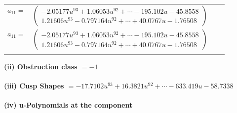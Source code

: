 \documentclass[1p]{elsarticle_modified}
\theoremstyle{definition}
\begin{document}
\begin{tabular}{m{7pt} m{180pt} m{7pt} m{180pt} }
\flushright $a_{11}=$&$\begin{pmatrix}-2.05177 u^{93}+1.06053 u^{92}+\cdots-195.102 u-45.8558\\1.21606 u^{93}-0.797164 u^{92}+\cdots+40.0767 u-1.76508\end{pmatrix}$\\ \flushright $a_{11}=$&$\begin{pmatrix}-2.05177 u^{93}+1.06053 u^{92}+\cdots-195.102 u-45.8558\\1.21606 u^{93}-0.797164 u^{92}+\cdots+40.0767 u-1.76508\end{pmatrix}$\\&\end{tabular}
\flushleft \textbf{(ii) Obstruction class $= -1$}\\~\\
\flushleft \textbf{(iii) Cusp Shapes $= -17.7102 u^{93}+16.3821 u^{92}+\cdots-633.419 u-58.7338$}\\~\\
\newpage\renewcommand{\arraystretch}{1}
\flushleft \textbf{(iv) u-Polynomials at the component}\newline \\
\end{document}
